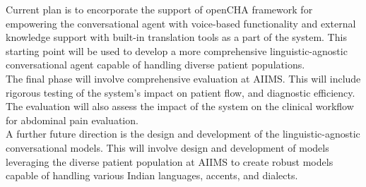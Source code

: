 \noindent Current plan is to encorporate the support of openCHA framework \cite{abbasian2023conversational} for empowering the conversational agent with voice-based functionality and external knowledge support with built-in translation tools as a part of the system. This starting point will be used to develop a more comprehensive linguistic-agnostic conversational agent capable of handling diverse patient populations.\\[\baselineskip]

\noindent The final phase will involve comprehensive evaluation at AIIMS. This will include rigorous testing of the system's impact on patient flow, and diagnostic efficiency. The evaluation will also assess the impact of the system on the clinical workflow for abdominal pain evaluation.\\[\baselineskip]

\noindent A further future direction is the design and development of the linguistic-agnostic conversational models. This will involve design and development of models leveraging the diverse patient population at AIIMS to create robust models capable of handling various Indian languages, accents, and dialects. \\[\baselineskip]



